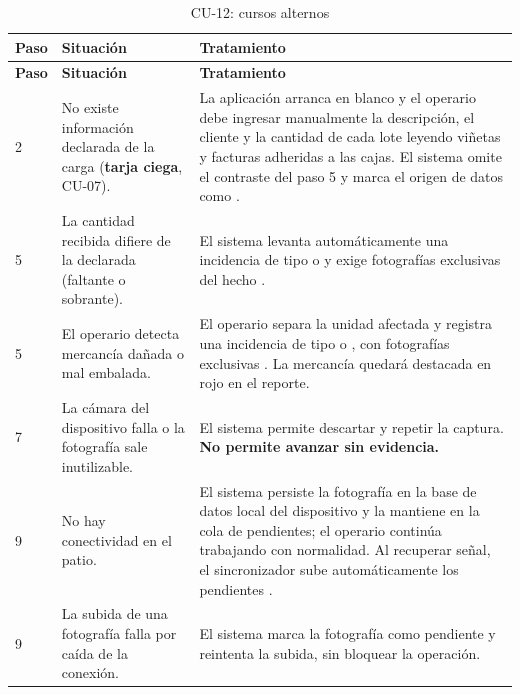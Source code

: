 {\estilotabla
\begin{longtable}{C{0.06\textwidth} L{0.38\textwidth} L{0.48\textwidth}}

\caption{CU-12: cursos alternos}
\label{tab:cu12_alt}
\\

\toprule
\textbf{Paso} & \textbf{Situación} & \textbf{Tratamiento} \\
\midrule
\endfirsthead

\toprule
\textbf{Paso} & \textbf{Situación} & \textbf{Tratamiento} \\
\midrule
\endhead

2 & No existe información declarada de la carga (\textbf{tarja ciega}, CU-07). &
La aplicación arranca en blanco y el operario debe ingresar manualmente la descripción, el cliente
y la cantidad de cada lote leyendo viñetas y facturas adheridas a las cajas. El sistema omite el
contraste del paso 5 y marca el origen de datos como . \\
\midrule

5 & La cantidad recibida difiere de la declarada (faltante o sobrante). &
El sistema levanta automáticamente una incidencia de tipo  o  y
exige fotografías exclusivas del hecho . \\
\midrule

5 & El operario detecta mercancía dañada o mal embalada. &
El operario separa la unidad afectada y registra una incidencia de tipo  o
, con fotografías exclusivas . La mercancía quedará destacada
en rojo en el reporte. \\
\midrule

7 & La cámara del dispositivo falla o la fotografía sale inutilizable. &
El sistema permite descartar y repetir la captura. \textbf{No permite avanzar sin evidencia.} \\
\midrule

9 & No hay conectividad en el patio. &
El sistema persiste la fotografía en la base de datos local del dispositivo y la mantiene en la
cola de pendientes; el operario continúa trabajando con normalidad. Al recuperar señal, el
sincronizador sube automáticamente los pendientes . \\
\midrule

9 & La subida de una fotografía falla por caída de la conexión. &
El sistema marca la fotografía como pendiente y reintenta la subida, sin bloquear la operación. \\
\midrule


\end{longtable}}
